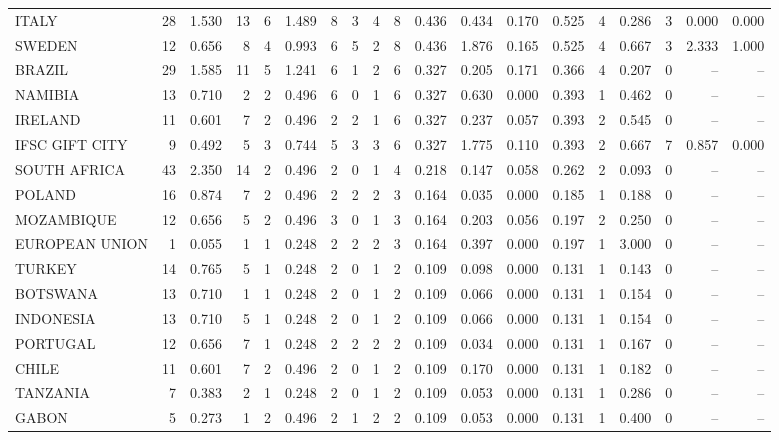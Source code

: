 \begin{tabular}{lrrrrrrrrrrrrrrrrrr}
ITALY & 28 & 1.530 & 13 & 6 & 1.489 & 8 & 3 & 4 & 8 & 0.436 & 0.434 & 0.170 & 0.525 & 4 & 0.286 & 3 & 0.000 & 0.000 \\
SWEDEN & 12 & 0.656 & 8 & 4 & 0.993 & 6 & 5 & 2 & 8 & 0.436 & 1.876 & 0.165 & 0.525 & 4 & 0.667 & 3 & 2.333 & 1.000 \\
BRAZIL & 29 & 1.585 & 11 & 5 & 1.241 & 6 & 1 & 2 & 6 & 0.327 & 0.205 & 0.171 & 0.366 & 4 & 0.207 & 0 & -- & -- \\
NAMIBIA & 13 & 0.710 & 2 & 2 & 0.496 & 6 & 0 & 1 & 6 & 0.327 & 0.630 & 0.000 & 0.393 & 1 & 0.462 & 0 & -- & -- \\
IRELAND & 11 & 0.601 & 7 & 2 & 0.496 & 2 & 2 & 1 & 6 & 0.327 & 0.237 & 0.057 & 0.393 & 2 & 0.545 & 0 & -- & -- \\
IFSC GIFT CITY & 9 & 0.492 & 5 & 3 & 0.744 & 5 & 3 & 3 & 6 & 0.327 & 1.775 & 0.110 & 0.393 & 2 & 0.667 & 7 & 0.857 & 0.000 \\
SOUTH AFRICA & 43 & 2.350 & 14 & 2 & 0.496 & 2 & 0 & 1 & 4 & 0.218 & 0.147 & 0.058 & 0.262 & 2 & 0.093 & 0 & -- & -- \\
POLAND & 16 & 0.874 & 7 & 2 & 0.496 & 2 & 2 & 2 & 3 & 0.164 & 0.035 & 0.000 & 0.185 & 1 & 0.188 & 0 & -- & -- \\
MOZAMBIQUE & 12 & 0.656 & 5 & 2 & 0.496 & 3 & 0 & 1 & 3 & 0.164 & 0.203 & 0.056 & 0.197 & 2 & 0.250 & 0 & -- & -- \\
EUROPEAN UNION & 1 & 0.055 & 1 & 1 & 0.248 & 2 & 2 & 2 & 3 & 0.164 & 0.397 & 0.000 & 0.197 & 1 & 3.000 & 0 & -- & -- \\
TURKEY & 14 & 0.765 & 5 & 1 & 0.248 & 2 & 0 & 1 & 2 & 0.109 & 0.098 & 0.000 & 0.131 & 1 & 0.143 & 0 & -- & -- \\
BOTSWANA & 13 & 0.710 & 1 & 1 & 0.248 & 2 & 0 & 1 & 2 & 0.109 & 0.066 & 0.000 & 0.131 & 1 & 0.154 & 0 & -- & -- \\
INDONESIA & 13 & 0.710 & 5 & 1 & 0.248 & 2 & 0 & 1 & 2 & 0.109 & 0.066 & 0.000 & 0.131 & 1 & 0.154 & 0 & -- & -- \\
PORTUGAL & 12 & 0.656 & 7 & 1 & 0.248 & 2 & 2 & 2 & 2 & 0.109 & 0.034 & 0.000 & 0.131 & 1 & 0.167 & 0 & -- & -- \\
CHILE & 11 & 0.601 & 7 & 2 & 0.496 & 2 & 0 & 1 & 2 & 0.109 & 0.170 & 0.000 & 0.131 & 1 & 0.182 & 0 & -- & -- \\
TANZANIA & 7 & 0.383 & 2 & 1 & 0.248 & 2 & 0 & 1 & 2 & 0.109 & 0.053 & 0.000 & 0.131 & 1 & 0.286 & 0 & -- & -- \\
GABON & 5 & 0.273 & 1 & 2 & 0.496 & 2 & 1 & 2 & 2 & 0.109 & 0.053 & 0.000 & 0.131 & 1 & 0.400 & 0 & -- & -- \\

\end{tabular}
